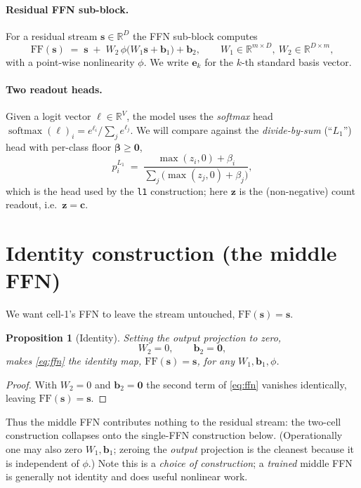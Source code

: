 \documentclass[11pt]{article}
\newtheorem{proposition}{Proposition}
\theoremstyle{remark}
\newcommand{\R}{\mathbb{R}}
\newcommand{\sm}{\operatorname{softmax}}
\newcommand{\ve}[1]{\bm{#1}}
\begin{document}
\paragraph{Residual FFN sub-block.}
For a residual stream $\ve s\in\R^{D}$ the FFN sub-block computes
\begin{equation}\label{eq:ffn}
\mathrm{FF}(\ve s) \;=\; \ve s \;+\; W_2\,\phi\!\big(W_1\ve s + \ve b_1\big) + \ve b_2 ,
\qquad W_1\in\R^{m\times D},\ W_2\in\R^{D\times m},
\end{equation}
with a point-wise nonlinearity $\phi$. We write $\ve e_k$ for the $k$-th standard basis vector.

\paragraph{Two readout heads.}
Given a logit vector $\ve\ell\in\R^V$, the model uses the \emph{softmax} head
$\sm(\ve\ell)_i = e^{\ell_i}/\sum_j e^{\ell_j}$. We will compare against the
\emph{divide-by-sum} (``$L_1$'') head with per-class floor $\ve\beta\ge\ve0$,
\begin{equation}\label{eq:l1}
p^{L_1}_i \;=\; \frac{\max(z_i,0)+\beta_i}{\sum_{j}\big(\max(z_j,0)+\beta_j\big)} ,
\end{equation}
which is the head used by the \texttt{l1} construction; here $\ve z$ is the (non-negative)
count readout, i.e.\ $\ve z=\ve c$.

\section{Identity construction (the middle FFN)}

We want cell-1's FFN to leave the stream untouched, $\mathrm{FF}(\ve s)=\ve s$.

\begin{proposition}[Identity]\label{prop:id}
Setting the output projection to zero,
\[
W_2 = 0,\qquad \ve b_2 = \ve 0 ,
\]
makes \eqref{eq:ffn} the identity map, $\mathrm{FF}(\ve s)=\ve s$, for \emph{any}
$W_1,\ve b_1,\phi$.
\end{proposition}
\begin{proof}
With $W_2=0$ and $\ve b_2=\ve 0$ the second term of \eqref{eq:ffn} vanishes identically,
leaving $\mathrm{FF}(\ve s)=\ve s$.
\end{proof}

\noindent
Thus the middle FFN contributes nothing to the residual stream: the two-cell
construction collapses onto the single-FFN construction below. (Operationally one may
also zero $W_1,\ve b_1$; zeroing the \emph{output} projection is the cleanest because it
is independent of $\phi$.) Note this is a \emph{choice of construction}; a \emph{trained}
middle FFN is generally not identity and does useful nonlinear work.
\end{document}
